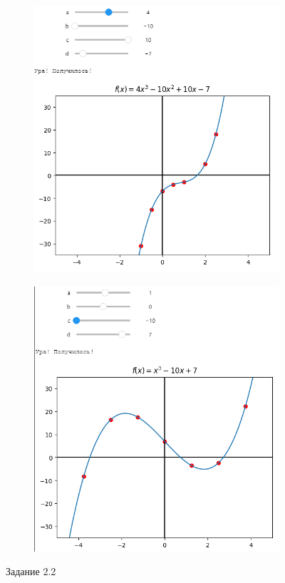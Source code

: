 \documentclass[14pt,a4paper]{extarticle}
\begin{document}
\begin{figure}[h!]
    \begin{subfigure}{.5\textwidth}
        \centering
        \includegraphics[width=0.9\linewidth]{figures/2.2-first.png}
    \end{subfigure}%
    \begin{subfigure}{.5\textwidth}
        \centering
        \includegraphics[width=0.9\linewidth]{figures/2.2-second.png}
    \end{subfigure}

    \caption{Задание 2.2}
    \label{fig:2.2}
\end{figure}
\end{document}
